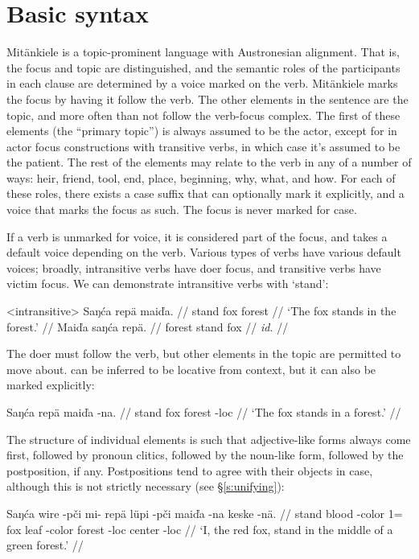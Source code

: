 \chapter{Basic syntax}

Mit\"ankiele is a topic-prominent language with Austronesian alignment. That is,
the focus and topic are distinguished, and the semantic roles of the
participants in each clause are determined by a voice marked on the verb.
Mit\"ankiele marks the focus by having it follow the verb. The other elements in
the sentence are the topic, and more often than not follow the verb-focus
complex. The first of these elements (the ``primary topic'') is always assumed
to be the actor, except for in actor focus constructions with transitive verbs,
in which case it's assumed to be the patient. The rest of the elements may
relate to the verb in any of a number of ways: heir, friend, tool, end, place,
beginning, why, what, and how. For each of these roles, there exists a case
suffix that can optionally mark it explicitly, and a voice that marks the focus
as such. The focus is never marked for case.

If a verb is unmarked for voice, it is considered part of the focus, and takes a
default voice depending on the verb. Various types of verbs have various default
voices; broadly, intransitive verbs have doer focus, and transitive verbs have
victim focus. We can demonstrate intransitive verbs with  `stand':

\pex<intransitive>
\a\begingl
\gla Saŋ\'ca rep\"a mai\v{d}a. //
\glb stand   fox    forest //
\glft `The fox stands in the forest.' //
\endgl
\a\begingl
\gla Mai\v{d}a saŋ\'ca rep\"a. //
\glb forest    stand   fox //
\glft \textit{id.} //
\endgl
\xe

\noindent The doer must follow the verb, but other elements in the topic are
permitted to move about.  can be inferred to be locative from
context, but it can also be marked explicitly:

\agl Saŋ\'ca rep\"a mai\v{d}a -na. //
\bgl stand   fox    forest    -{\sc loc} //
\tgl `The fox stands in a forest.' //\endgl

\noindent The structure of individual elements is such that adjective-like forms
always come first, followed by pronoun clitics, followed by the noun-like form,
followed by the postposition, if any. Postpositions tend to agree with their
objects in case, although this is not strictly necessary (see
\S\ref{s:unifying}):

\ex
\begingl
\gla Saŋ\'ca wire  -p\v{c}i mi- rep\"a l\"upi -p\v{c}i mai\v{d}a -na
  keske  -n\"a. //
\glb stand   blood -color   1=  fox    leaf   -color   forest    -{\sc loc}
  center -{\sc loc} //
\glft `I, the red fox, stand in the middle of a green forest.' //
\endgl
\xe

